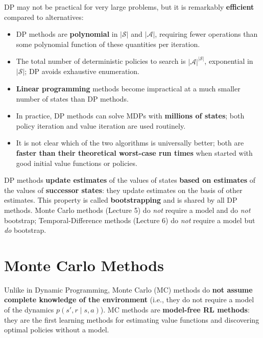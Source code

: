 \documentclass[11pt,a4paper]{article}
\theoremstyle{definition}
\theoremstyle{plain}
\theoremstyle{remark}
\begin{document}
DP may not be practical for very large problems, but it is remarkably \textbf{efficient} compared to alternatives:
\begin{itemize}
    \item DP methods are \textbf{polynomial} in $|\mathcal{S}|$ and $|\mathcal{A}|$, requiring fewer operations than some polynomial function of these quantities per iteration.
    \item The total number of deterministic policies to search is $|\mathcal{A}|^{|\mathcal{S}|}$, exponential in $|\mathcal{S}|$; DP avoids exhaustive enumeration.
    \item \textbf{Linear programming} methods become impractical at a much smaller number of states than DP methods.
    \item In practice, DP methods can solve MDPs with \textbf{millions of states}; both policy iteration and value iteration are used routinely.
    \item It is not clear which of the two algorithms is universally better; both are \textbf{faster than their theoretical worst-case run times} when started with good initial value functions or policies.
\end{itemize}

\begin{tcolorbox}[colback=green!5!white, colframe=green!60!black, title={Bootstrapping}]
DP methods \textbf{update estimates} of the values of states \textbf{based on estimates} of the values of \textbf{successor states}: they update estimates on the basis of other estimates. This property is called \textbf{bootstrapping} and is shared by all DP methods. Monte Carlo methods (Lecture 5) do \textit{not} require a model and do \textit{not} bootstrap; Temporal-Difference methods (Lecture 6) do \textit{not} require a model but \textit{do} bootstrap.
\end{tcolorbox}



\part{Monte Carlo Methods}

Unlike in Dynamic Programming, Monte Carlo (MC) methods do \textbf{not assume complete knowledge of the environment} (i.e., they do not require a model of the dynamics $p(s', r \mid s, a)$). MC methods are \textbf{model-free RL methods}: they are the first learning methods for estimating value functions and discovering optimal policies without a model.
\end{document}
